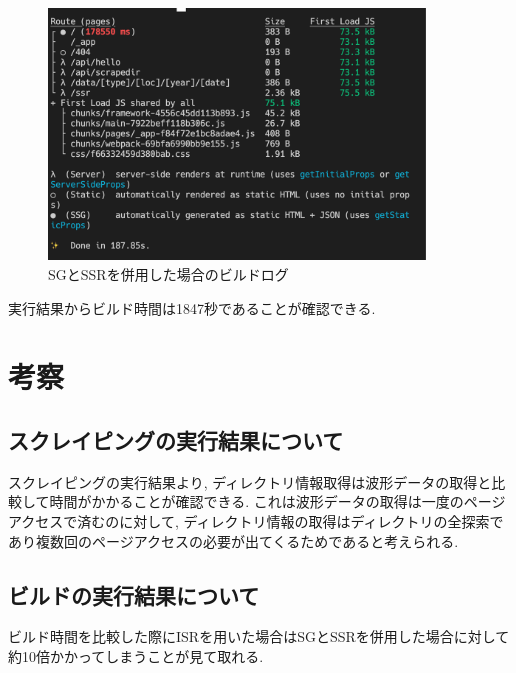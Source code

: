 \begin{figure}[htbp]
	\begin{center}
		\includegraphics[width=100mm]{./images/SGandSSR-log.png}
		\caption{SGとSSRを併用した場合のビルドログ}\label{fig:SG-SSR-build}
	\end{center}
\end{figure}

実行結果からビルド時間は1847秒であることが確認できる.

\section{考察}
\subsection{スクレイピングの実行結果について}
スクレイピングの実行結果より, ディレクトリ情報取得は波形データの取得と比較して時間がかかることが確認できる.
これは波形データの取得は一度のページアクセスで済むのに対して, ディレクトリ情報の取得はディレクトリの全探索であり複数回のページアクセスの必要が出てくるためであると考えられる.

\subsection{ビルドの実行結果について}
ビルド時間を比較した際にISRを用いた場合はSGとSSRを併用した場合に対して約10倍かかってしまうことが見て取れる.

